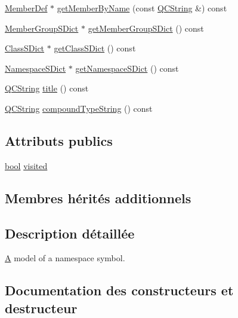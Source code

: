 \begin{DoxyCompactItemize}
\item 
\hyperlink{class_member_def}{Member\+Def} $\ast$ \hyperlink{class_namespace_def_afaa7d44a29268c22e0a793de45df7aee}{get\+Member\+By\+Name} (const \hyperlink{class_q_c_string}{Q\+C\+String} \&) const 
\item 
\hyperlink{class_member_group_s_dict}{Member\+Group\+S\+Dict} $\ast$ \hyperlink{class_namespace_def_aea078e09ccce6b188ce3abcdcc5d446a}{get\+Member\+Group\+S\+Dict} () const 
\item 
\hyperlink{class_class_s_dict}{Class\+S\+Dict} $\ast$ \hyperlink{class_namespace_def_adf0931f038ed73eb2b7723e9cacdca11}{get\+Class\+S\+Dict} () const 
\item 
\hyperlink{class_namespace_s_dict}{Namespace\+S\+Dict} $\ast$ \hyperlink{class_namespace_def_a78cb949e5a5e03e1d9b34bd51201a77b}{get\+Namespace\+S\+Dict} () const 
\item 
\hyperlink{class_q_c_string}{Q\+C\+String} \hyperlink{class_namespace_def_a73afeaf95f4254b02959d594f1a1e843}{title} () const 
\item 
\hyperlink{class_q_c_string}{Q\+C\+String} \hyperlink{class_namespace_def_a373826f2fb1ecd5affee58ebfc8fd3dd}{compound\+Type\+String} () const 
\end{DoxyCompactItemize}
\subsection*{Attributs publics}
\begin{DoxyCompactItemize}
\item 
\hyperlink{qglobal_8h_a1062901a7428fdd9c7f180f5e01ea056}{bool} \hyperlink{class_namespace_def_ae4831118e585d0852f159591c094fd0b}{visited}
\end{DoxyCompactItemize}
\subsection*{Membres hérités additionnels}


\subsection{Description détaillée}
\hyperlink{class_a}{A} model of a namespace symbol. 

\subsection{Documentation des constructeurs et destructeur}
\hypertarget{class_namespace_def_a6099f6929aae4a799a89c4d0ba1b58fe}{}
